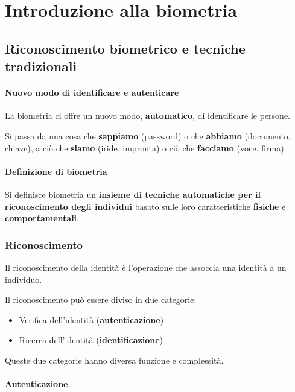 \chapter{Introduzione alla biometria}

\section{Riconoscimento biometrico e tecniche tradizionali}

\subsubsection{Nuovo modo di identificare e autenticare}

La biometria ci offre un nuovo modo, \textbf{automatico}, di identificare le persone.

\noindent Si passa da una cosa che \textbf{sappiamo} (password) o che \textbf{abbiamo} (documento, chiave), a ciò che \textbf{siamo} (iride, impronta) o ciò che \textbf{facciamo} (voce, firma).

\subsubsection{Definizione di biometria}

Si definisce biometria un \textbf{insieme di tecniche automatiche per il riconoscimento degli individui} basato sulle loro caratteristiche \textbf{fisiche} e \textbf{comportamentali}.

\subsection{Riconoscimento}

Il riconoscimento della identità è l'operazione che assoccia una identità a un individuo.

Il riconoscimento può essere diviso in due categorie:
\begin{itemize}
    \item Verifica dell'identità (\textbf{autenticazione})
    \item Ricerca dell'identità (\textbf{identificazione})
\end{itemize}
Queste due categorie hanno diversa funzione e complessità.

\subsubsection{Autenticazione}

